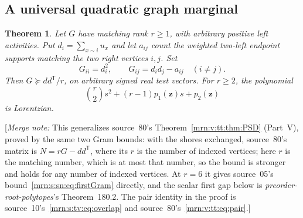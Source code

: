 \documentclass[11pt,a4paper]{article}
\newtheorem{theorem}{Theorem}[section]
\theoremstyle{remark}\newtheorem{remark}[theorem]{Remark}
\newcommand{\PSD}{\succeq}                 %
\newcommand{\mnote}[1]{[\textit{Merge note:} #1]}
\newcommand{\prp}{\emph{preorder-root-polytopes}}
\begin{document}
\subsection{A universal quadratic graph marginal}
\begin{theorem}\label{mrn:t:tn:thm:quadratic}
Let $G$ have matching rank $r\ge1$, with arbitrary positive left activities.
Put $d_i=\sum_{x\sim i}u_x$ and let $a_{ij}$ count the weighted two-left
endpoint supports matching the two right vertices $i,j$. Set
\[
 G_{ii}=d_i^2,\qquad G_{ij}=d_id_j-a_{ij}\quad(i\ne j).
\]
Then $G\PSD dd^{\mathsf T}/r$, on arbitrary signed real test vectors.
For $r\ge2$, the polynomial
\[
 \binom r2s^2+(r-1)p_1(\mathbf z)s+p_2(\mathbf z)
\]
is Lorentzian.
\end{theorem}
\mnote{This generalizes source~80's Theorem~\ref{mrn:v:tt:thm:PSD} (Part~V),
proved by the same two Gram bounds: with the shores exchanged, source~80's
matrix is $N=rG-dd^{\mathsf T}$, where its $r$ is the number of indexed
vertices; here $r$ is the matching number, which is at most that number, so
the bound is stronger and holds for any number of indexed vertices. At
$r=6$ it gives source~05's bound~\eqref{mrn:s:sn:eq:firstGram} directly, and
the scalar first gap below is \prp's Theorem~180.2. The pair identity in the
proof is source~10's~\eqref{mrn:s:tv:eq:overlap} and
source~80's~\eqref{mrn:v:tt:eq:pair}.}
\end{document}
